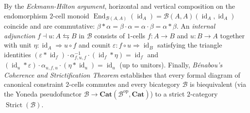 By the \emph{Eckmann-Hilton argument}, horizontal and vertical composition on the endomorphism $2$-cell monoid $\operatorname{End}_{\mathcal{B}(A, A)}(\operatorname{id}_A) = \mathcal{B}(A, A)(\operatorname{id}_A, \operatorname{id}_A)$ coincide and are commutative: $\beta \ast \alpha = \beta \cdot \alpha = \alpha \cdot \beta = \alpha \ast \beta$. An \emph{internal adjunction} $f \dashv u\colon A \leftrightarrows B$ in $\mathcal{B}$ consists of $1$-cells $f\colon A \to B$ and $u\colon B \to A$ together with unit $\eta\colon \operatorname{id}_A \Rightarrow u \circ f$ and counit $\varepsilon\colon f \circ u \Rightarrow \operatorname{id}_B$ satisfying the triangle identities $(\varepsilon \ast \operatorname{id}_f) \cdot \alpha_{f,u,f}^{-1} \cdot (\operatorname{id}_f \ast \eta) = \operatorname{id}_f$ and $(\operatorname{id}_u \ast \varepsilon) \cdot \alpha_{u,f,u} \cdot (\eta \ast \operatorname{id}_u) = \operatorname{id}_u$ (up to unitors). Finally, \emph{B\'enabou's Coherence and Strictification Theorem} establishes that every formal diagram of canonical constraint $2$-cells commutes and every bicategory $\mathcal{B}$ is biequivalent (via the Yoneda pseudofunctor $\mathcal{B} \to \mathbf{Cat}(\mathcal{B}^{\mathrm{op}}, \mathbf{Cat})$) to a strict $2$-category $\operatorname{Strict}(\mathcal{B})$.


